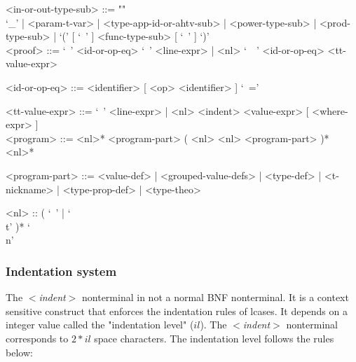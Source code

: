\documentclass{article}
\begin{document}
\begin{grammar}
<in-or-out-type-sub> ::= ""\\
`_' | <param-t-var> | <type-app-id-or-ahtv-sub> | <power-type-sub> |
<prod-type-sub> | `(' [ `\ ' ] <func-type-sub> [ `\ ' ] `)'
\\

<proof> ::=
`\ ' <id-or-op-eq> `\ ' <line-expr> |
<nl> `\ \ ' <id-or-op-eq>  <tt-value-expr>

<id-or-op-eq> ::= <identifier> [ <op> <identifier> ] `\ ='

<tt-value-expr> ::=
`\ ' <line-expr> | <nl> <indent> <value-expr> [ <where-expr> ]
\\

<program> ::=
<nl>* <program-part> ( <nl> <nl> <program-part> )* <nl>*

<program-part> ::=
<value-def> | <grouped-value-defs> | <type-def> | <t-nickname> |
<type-prop-def> | <type-theo>

<nl> :: ( `\ ' | `\\t' )* `\\n'
\end{grammar}

\newpage

\subsubsection{Indentation system}
\label{subsubsec:indsys}

The \textit{$<$indent$>$} nonterminal in not a normal BNF nonterminal. It is a
context sensitive construct that enforces the indentation rules of lcases.
It depends on a integer value called the "indentation level" ($il$).
The \textit{$<$indent$>$} nonterminal corresponds to $2*il$ space characters.
The indentation level follows the rules below:
\end{document}
